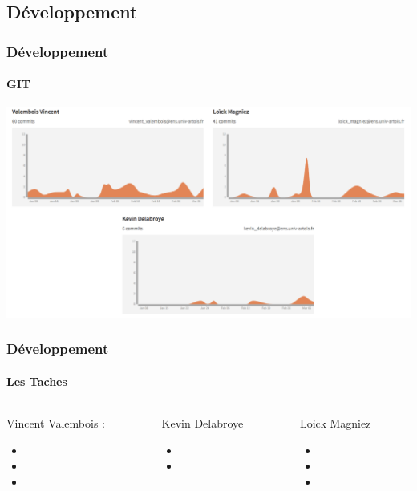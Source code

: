 \documentclass{beamer}
\begin{document}
\begin{darkframes}
 \section{Développement}
 \begin{frame}
 	 \frametitle{Développement}
 	 \begin{center}
 	 \framesubtitle{GIT}
		\includegraphics[scale=0.40]{./Image/git.png}
		\end{center}
    \end{frame}
    
    \begin{frame}
     	 \frametitle{Développement}
 	 \begin{center}
 	 \framesubtitle{Les Taches}
		\end{center}
		 	 \begin{columns}
 	 \begin{column}{3cm}
 	  	 \begin{center}
 	 Vincent Valembois :
	 	 
\begin{itemize}
  \item 
  \item 
  \item 
\end{itemize}
 	 
 	 	\end{center}
 	 \end{column}
 	  	 \begin{column}{3cm}
 	 	  	 \begin{center}
 	 Kevin Delabroye
 	 \begin{itemize}
  \item 
  \item 
\end{itemize}
 	 	\end{center}
 	 \end{column}
 	  	 \begin{column}{3cm}
 	 	  	 \begin{center}
 	 Loick Magniez
 	  	 \begin{itemize}
  \item 
  \item 
    \item 
\end{itemize}
 	 	\end{center}
 	 \end{column}
    \end{columns}
    \end{frame}
    

\end{darkframes}
\end{document}
